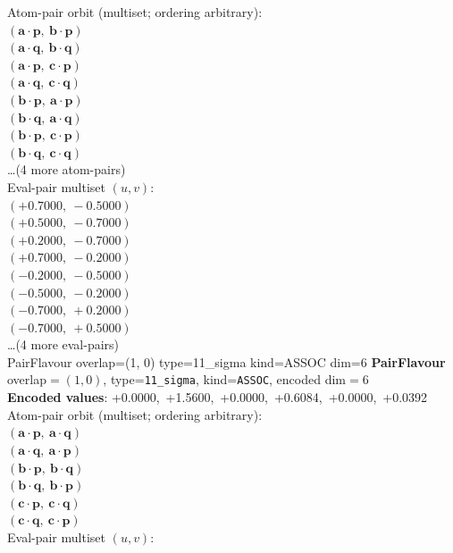 \documentclass[a4paper,11pt]{article}
\newcommand{\pdcegfomjfhook}[2]{\mathbf{#1} \cdot \mathbf{#2}}
\begin{document}
\quad Atom-pair orbit (multiset; ordering arbitrary):\\
$(\pdcegfomjfhook{a}{p},\ \pdcegfomjfhook{b}{p})$\\
$(\pdcegfomjfhook{a}{q},\ \pdcegfomjfhook{b}{q})$\\
$(\pdcegfomjfhook{a}{p},\ \pdcegfomjfhook{c}{p})$\\
$(\pdcegfomjfhook{a}{q},\ \pdcegfomjfhook{c}{q})$\\
$(\pdcegfomjfhook{b}{p},\ \pdcegfomjfhook{a}{p})$\\
$(\pdcegfomjfhook{b}{q},\ \pdcegfomjfhook{a}{q})$\\
$(\pdcegfomjfhook{b}{p},\ \pdcegfomjfhook{c}{p})$\\
$(\pdcegfomjfhook{b}{q},\ \pdcegfomjfhook{c}{q})$\\
\quad \ldots (4 more atom-pairs)\\
\quad Eval-pair multiset $(u, v)$:\\
$(+0.7000,\ -0.5000)$\\
$(+0.5000,\ -0.7000)$\\
$(+0.2000,\ -0.7000)$\\
$(+0.7000,\ -0.2000)$\\
$(-0.2000,\ -0.5000)$\\
$(-0.5000,\ -0.2000)$\\
$(-0.7000,\ +0.2000)$\\
$(-0.7000,\ +0.5000)$\\
\quad \ldots (4 more eval-pairs)\\
    PairFlavour  overlap=(1, 0)  type=11\_sigma  kind=ASSOC  dim=6
\textbf{PairFlavour} overlap$=(1, 0)$, type=\texttt{11\_sigma}, kind=\texttt{ASSOC}, encoded dim$=6$\\
\textbf{      Encoded values}: +0.0000,\ +1.5600,\ +0.0000,\ +0.6084,\ +0.0000,\ +0.0392\\
\quad Atom-pair orbit (multiset; ordering arbitrary):\\
$(\pdcegfomjfhook{a}{p},\ \pdcegfomjfhook{a}{q})$\\
$(\pdcegfomjfhook{a}{q},\ \pdcegfomjfhook{a}{p})$\\
$(\pdcegfomjfhook{b}{p},\ \pdcegfomjfhook{b}{q})$\\
$(\pdcegfomjfhook{b}{q},\ \pdcegfomjfhook{b}{p})$\\
$(\pdcegfomjfhook{c}{p},\ \pdcegfomjfhook{c}{q})$\\
$(\pdcegfomjfhook{c}{q},\ \pdcegfomjfhook{c}{p})$\\
\quad Eval-pair multiset $(u, v)$:\\
\end{document}
